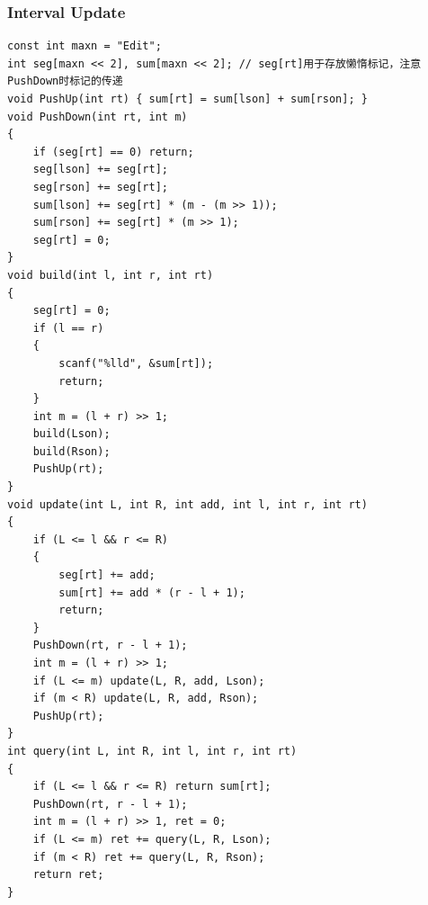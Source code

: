 \documentclass[twoside]{article}
\begin{document}
\subsubsection{Interval Update}
\begin{lstlisting}
const int maxn = "Edit";
int seg[maxn << 2], sum[maxn << 2]; // seg[rt]用于存放懒惰标记，注意PushDown时标记的传递
void PushUp(int rt) { sum[rt] = sum[lson] + sum[rson]; }
void PushDown(int rt, int m)
{
    if (seg[rt] == 0) return;
    seg[lson] += seg[rt];
    seg[rson] += seg[rt];
    sum[lson] += seg[rt] * (m - (m >> 1));
    sum[rson] += seg[rt] * (m >> 1);
    seg[rt] = 0;
}
void build(int l, int r, int rt)
{
    seg[rt] = 0;
    if (l == r)
    {
        scanf("%lld", &sum[rt]);
        return;
    }
    int m = (l + r) >> 1;
    build(Lson);
    build(Rson);
    PushUp(rt);
}
void update(int L, int R, int add, int l, int r, int rt)
{
    if (L <= l && r <= R)
    {
        seg[rt] += add;
        sum[rt] += add * (r - l + 1);
        return;
    }
    PushDown(rt, r - l + 1);
    int m = (l + r) >> 1;
    if (L <= m) update(L, R, add, Lson);
    if (m < R) update(L, R, add, Rson);
    PushUp(rt);
}
int query(int L, int R, int l, int r, int rt)
{
    if (L <= l && r <= R) return sum[rt];
    PushDown(rt, r - l + 1);
    int m = (l + r) >> 1, ret = 0;
    if (L <= m) ret += query(L, R, Lson);
    if (m < R) ret += query(L, R, Rson);
    return ret;
}
\end{lstlisting}
\end{document}
